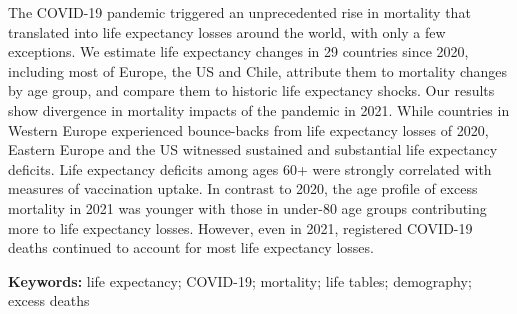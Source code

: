 \documentclass[12pt]{article}
\begin{document}
\begin{titlepage}
{%

The COVID-19 pandemic triggered an unprecedented rise in mortality that translated into life expectancy losses around the world, with only a few exceptions. We estimate life expectancy changes in 29 countries since 2020, including most of Europe, the US and Chile, attribute them to mortality changes by age group, and compare them to historic life expectancy shocks. Our results show divergence in mortality impacts of the pandemic in 2021. While countries in Western Europe experienced bounce-backs from life expectancy losses of 2020, Eastern Europe and the US witnessed sustained and substantial life expectancy deficits. Life expectancy deficits among ages 60+ were strongly correlated with measures of vaccination uptake. In contrast to 2020, the age profile of excess mortality in 2021 was younger with those in under-80 age groups contributing more to life expectancy losses. However, even in 2021, registered COVID-19 deaths continued to account for most life expectancy losses.

\textbf{Keywords:}
life expectancy; COVID-19; mortality; life tables; demography; excess deaths
\par\medskip}

\clearpage


\end{titlepage}
\end{document}
